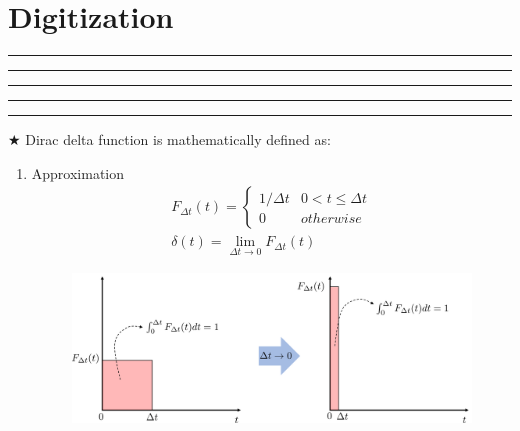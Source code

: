 \setcounter{chapter}{7}
\setcounter{section}{0}
\section{Digitization}
\vspace{-8pt} \hrule \hrule \hrule \hrule \hrule  \vspace{12pt}

$\bigstar$ Dirac delta function is mathematically defined as:
\begin{enumerate}
	\item Approximation
	\begin{align*}
		F_{\Delta t}(t) = \begin{cases}1/\Delta t & 0 < t \leq \Delta t \\0 & otherwise \end{cases}\\
		\delta(t) =  \lim_{\Delta t\rightarrow 0} F_{\Delta t}(t) 
	\end{align*}
	    \begin{figure}[!h]
	        \centering
	        \includegraphics[width=20cm]{./FIG_Franklin/fig8-smc2.png}
	    \end{figure}

\end{enumerate}

